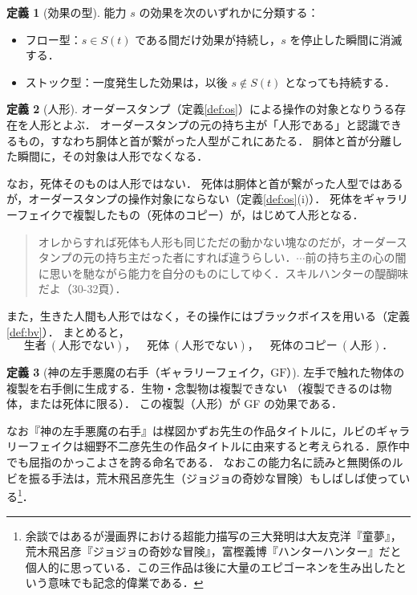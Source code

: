 \documentclass[a4paper,12pt]{jarticle}
\theoremstyle{definition}
\newtheorem{definition}{定義}
\theoremstyle{plain}
\theoremstyle{definition}
\theoremstyle{remark}
\newcommand{\Act}{S}   %
\newcommand{\GF}{\mathrm{GF}}    %
\begin{document}
\begin{definition}[効果の型]\label{def:type}
能力 $s$ の効果を次のいずれかに分類する：
\begin{itemize}
\item フロー型：$s\in\Act(t)$ である間だけ効果が持続し，$s$ を停止した瞬間に消滅する．
\item ストック型：一度発生した効果は，以後 $s\notin\Act(t)$ となっても持続する．
\end{itemize}
\end{definition}

\begin{definition}[人形]\label{def:doll}
オーダースタンプ（定義\ref{def:os}）による操作の対象となりうる存在を{人形}とよぶ．
オーダースタンプの元の持ち主が「人形である」と認識できるもの，すなわち胴体と首が繋がった人型がこれにあたる．
胴体と首が分離した瞬間に，その対象は人形でなくなる．
\end{definition}


なお，死体そのものは人形ではない．
死体は胴体と首が繋がった人型ではあるが，オーダースタンプの操作対象にならない（定義\ref{def:os}(i)）．
死体をギャラリーフェイクで複製したもの（死体のコピー）が，はじめて人形となる．

\begin{quotation}
オレからすれば死体も人形も同じただの動かない塊なのだが，オーダースタンプの元の持ち主だった者にすれば違うらしい．$\cdots$前の持ち主の心の闇に思いを馳ながら能力を自分のものにしてゆく．スキルハンターの醍醐味だよ（30-32頁）．
\end{quotation}

また，生きた人間も人形ではなく，その操作にはブラックボイスを用いる（定義\ref{def:bv}）．
まとめると，
\[
\text{生者}\ (\text{人形でない})，\quad
\text{死体}\ (\text{人形でない})，\quad
\text{死体のコピー}\ (\text{人形})．
\]


\begin{definition}[神の左手悪魔の右手（ギャラリーフェイク，$\GF$）]\label{def:gf}
左手で触れた物体の複製を右手側に生成する．生物・念製物は複製できない
（複製できるのは物体，または死体に限る）．
この複製（人形）が GF の効果である．
\end{definition}

なお『神の左手悪魔の右手』は楳図かずお先生の作品タイトルに，ルビのギャラリーフェイクは細野不二彦先生の作品タイトルに由来すると考えられる．原作中でも屈指のかっこよさを誇る命名である．
なおこの能力名に読みと無関係のルビを振る手法は，荒木飛呂彦先生（ジョジョの奇妙な冒険）もしばしば使っている\footnote{余談ではあるが漫画界における超能力描写の三大発明は大友克洋『童夢』，荒木飛呂彦『ジョジョの奇妙な冒険』，富樫義博『ハンターハンター』だと個人的に思っている．この三作品は後に大量のエピゴーネンを生み出したという意味でも記念的偉業である．}．
\end{document}
